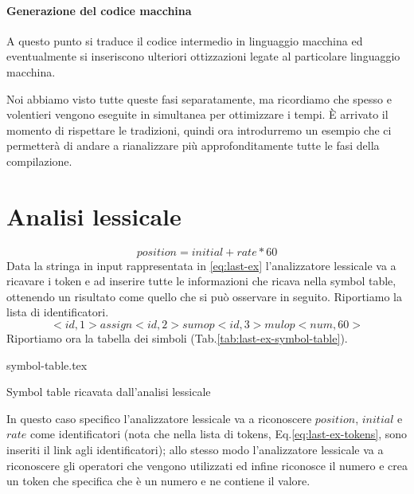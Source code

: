 \documentclass[class=book, crop=false, oneside, 12pt]{standalone}
\begin{document}
\paragraph{Generazione del codice macchina}	A questo punto si traduce il codice intermedio in linguaggio macchina ed eventualmente si inseriscono ulteriori ottizzazioni legate al particolare linguaggio macchina.
    
Noi abbiamo visto tutte queste fasi separatamente, ma ricordiamo che spesso e volentieri vengono eseguite in simultanea per ottimizzare i tempi.
È arrivato il momento di rispettare le tradizioni, quindi ora introdurremo un esempio che ci permetterà di andare a rianalizzare più approfonditamente tutte le fasi della compilazione.
\section{Analisi lessicale}
\begin{equation}
    \label{eq:last-ex}
    position = initial + rate * 60
\end{equation}
Data la stringa in input rappresentata in \ref{eq:last-ex} l'analizzatore lessicale va a ricavare i token e ad inserire tutte le informazioni che ricava nella symbol table, ottenendo un risultato come quello che si può osservare in seguito.
Riportiamo la lista di identificatori.
\begin{equation}
    \label{eq:last-ex-tokens}
    <id,1> assign <id,2> sumop <id, 3> mulop <num, 60>
\end{equation}
Riportiamo ora la tabella dei simboli (Tab.\ref{tab:last-ex-symbol-table}).
\begin{table}[H]
	\centering
	{symbol-table.tex}
    \caption{Symbol table ricavata dall'analisi lessicale}
    \label{tab:last-ex-symbol-table}
\end{table} 

In questo caso specifico l'analizzatore lessicale va a riconoscere \(position\), \(initial\) e \(rate\) come identificatori (nota che nella lista di tokens, Eq.\ref{eq:last-ex-tokens}, sono inseriti il link agli identificatori); allo stesso modo l'analizzatore lessicale va a riconoscere gli operatori che vengono utilizzati ed infine riconosce il numero e crea un token che specifica che è un numero e ne contiene il valore.
\end{document}
